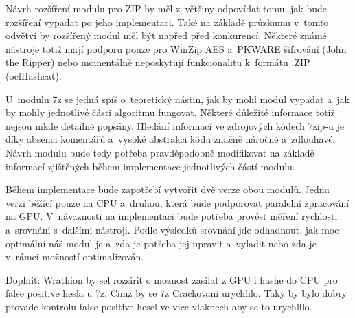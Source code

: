  Návrh rozšíření modulu pro ZIP by měl z~většiny odpovídat tomu, jak bude rozšíření vypadat po jeho
implementaci. Také na základě průzkumu v~tomto odvětví by rozšířený modul měl být napřed před
konkurencí. Některé známé nástroje totiž mají podporu pouze pro WinZip AES a~PKWARE šifrování
(John the Ripper) nebo momentálně neposkytují funkcionalitu k~formátu .ZIP (oclHashcat).  

 U~modulu 7z se jedná spíš o~teoretický nástin, jak by mohl modul vypadat a~jak by
mohly jednotlivé části algoritmu fungovat. Některé důležité informace totiž nejsou nikde detailně
popsány. Hledání informací ve zdrojových kódech 7zip-u je díky absenci komentářů a~vysoké
abstrakci kódu značně náročné a~zdlouhavé. Návrh modulu bude tedy potřeba pravděpodobně
modifikovat na základě informací zjištěných během implementace jednotlivých částí modulu.

 Během implementace bude zapotřebí vytvořit dvě verze obou modulů. Jednu verzi běžící pouze na
CPU a~druhou, která bude podporovat paralelní zpracování na GPU. V~návaznosti na implementaci
bude potřeba provést měření rychlosti a~srovnání s~dalšími nástroji. Podle výsledků srovnání
jde odhadnout, jak moc optimální náš modul je a~zda je potřeba jej upravit a~vyladit nebo
zda je v~rámci možností optimalizován.


Doplnit: Wrathion by sel rozsirit o moznost zasilat z GPU i hashe do CPU pro false positive hesla
u 7z. Cimz by se 7z Crackovani urychlilo. Taky by bylo dobry provade kontrolu false positive hesel
ve vice vlaknech aby se to urychlilo.


